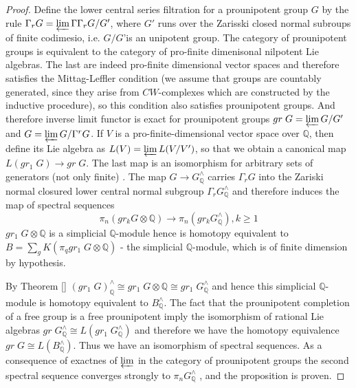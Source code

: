 \documentclass[11pt,a4paper]{article}
\begin{document}
\begin{proof}
Define the lower central series filtration for a prounipotent group $G$ by the rule $\Gamma_r G=\varprojlim \Gamma \Gamma_r G/G'$, where $G'$ runs over the Zarisski closed normal subroups of finite codimesio, i.e. $G/G$'is an unipotent group.  The category of prounipotent groups is equivalent to the category of pro-finite dimenisonal nilpotent Lie algebras. 
The last are indeed pro-finite dimensional vector spaces and therefore satisfies the Mittag-Leffler condition (we assume that groups are countably generated, since they arise from $CW$-complexes which are constructed by the inductive procedure), so this condition also satisfies prounipotent groups.
And therefore inverse limit functor is exact for prounipotent groups $gr\; G=\varprojlim G/G'$ and $G=\varprojlim G/\Gamma^r G$.
If $V$ is a pro-finite-dimensional vector space over $\mathbb{Q}$, then define its Lie algebra as $L(V)=\varprojlim L(V/V')$, so that we obtain a canonical map $L(gr_1 \; G)\rightarrow gr\; G$.
The last map is an isomorphism for arbitrary sets of generators (not only finite) \cite[Definition 10 and Remark 6]{Mikh2016}.
The map $G\rightarrow G^{\wedge}_{\mathbb{Q}}$ carries $\Gamma_rG$ into the Zariski normal closured lower central normal subgroup $\Gamma_r G^{\wedge}_{\mathbb{Q}}$ and therefore induces the map of spectral sequences 
$$\pi_n(gr_k G\otimes \mathbb{Q})\rightarrow \pi_n (gr_k G^{\wedge}_{\mathbb{Q}}), k\geq 1$$
$gr_1\; G \otimes \mathbb{Q}$ is a simplicial $\mathbb{Q}$-module hence is homotopy equivalent to $B=\sum_g K(\pi_q gr_1\; G\otimes \mathbb{Q})$ - the simplicial $\mathbb{Q}$-module, which is of finite dimension by hypothesis.

By Theorem \ref{} $(gr_1\; G)^{\wedge}_{\mathbb{Q}}\cong gr_1\; G\otimes \mathbb{Q}\cong gr_1 \; G^{\wedge}_{\mathbb{Q}}$ and hence this simplicial $\mathbb{Q}$-module is homotopy equivalent to $B^{\wedge}_{\mathbb{Q}}$. The fact that the prounipotent completion of a free group is a free prounipotent imply the isomorphism of rational Lie algebras $gr\; G^{\wedge}_{\mathbb{Q}}\cong L(gr_1 \;G^{\wedge}_{\mathbb{Q}})$ and therefore we have the homotopy equivalence $gr\; G\cong L(B^{\wedge}_{\mathbb{Q}})$. Thus we have an isomorphism of spectral sequences. As a consequence of exactnes of $\varprojlim$ in the category of prounipotent groups the second spectral sequence converges strongly to $\pi_n G^{\wedge}_{\mathbb{Q}}$ \cite[]{CA}, and the proposition is proven.
\end{proof}
\end{document}
